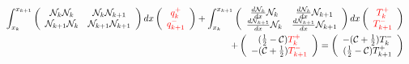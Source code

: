 \begin{itemize}
\begin{eqnarray}
&& \int_{x_k}^{x_{k+1}} 
\left(
\begin{array}{cc}
 {\mathcal{N}}_k {\mathcal{N}}_k     & {\mathcal{N}}_k {\mathcal{N}}_{k+1} \\
 {\mathcal{N}}_{k+1} {\mathcal{N}}_k & {\mathcal{N}}_{k+1} {\mathcal{N}}_{k+1}
\end{array}
\right)dx
\left(
\begin{array}{c}
    {\color{red}q_k^+}  \\
    {\color{red}q_{k+1}^-}
\end{array}
\right)+
\int_{x_k}^{x_{k+1}} 
\left(
\begin{array}{cc}
\frac{d{\mathcal{N}}_k}{dx} {\mathcal{N}}_k     & \frac{d{\mathcal{N}}_k}{dx} {\mathcal{N}}_{k+1} \\
\frac{d{\mathcal{N}}_{k+1}}{dx} {\mathcal{N}}_k & \frac{d{\mathcal{N}}_{k+1}}{dx} {\mathcal{N}}_{k+1}
\end{array}
\right)dx
\left(
\begin{array}{c}
 {\color{red}T_k^+}  \\
{\color{red}T_{k+1}^-} 
\end{array}
\right) \nonumber \\
&&\qquad+ \left(
\begin{array}{c}
     (\frac{1}{2}-{\cal C}) {\color{red}T_k^+}  \\
     -({\cal C}+\frac{1}{2}){\color{red}T_{k+1}^-} 
\end{array}
\right)
= \left(
\begin{array}{c}
     -({\cal C}+\frac{1}{2})  T_k^- \\
     (\frac{1}{2}-{\cal C})  T_{k+1}^+ 
\end{array}
\right) 
\label{eq:dgT1}
\end{eqnarray}





\end{itemize}


